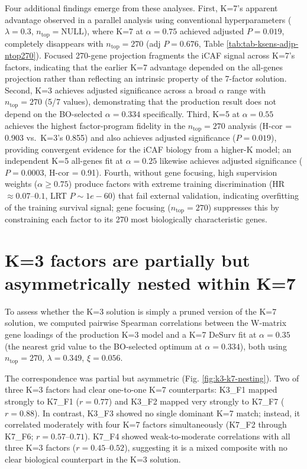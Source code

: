 \documentclass[
]{article}
\begin{document}
Four additional findings emerge from these analyses. First, K=7's
apparent advantage observed in a parallel analysis using conventional
hyperparameters (\(\lambda=0.3\), \(n_{\text{top}} = \text{NULL}\)),
where K=7 at \(\alpha=0.75\) achieved adjusted \(P = 0.019\), completely
disappears with \(n_{\text{top}} = 270\) (adj \(P = 0.676\), Table
\ref{tab:tab-ksens-adjp-ntop270}). Focused 270-gene projection fragments
the iCAF signal across K=7's factors, indicating that the earlier K=7
advantage depended on the all-genes projection rather than reflecting an
intrinsic property of the 7-factor solution. Second, K=3 achieves
adjusted significance across a broad \(\alpha\) range with
\(n_{\text{top}} = 270\) (5/7 values), demonstrating that the production
result does not depend on the BO-selected \(\alpha = 0.334\)
specifically. Third, K=5 at \(\alpha=0.55\) achieves the highest
factor-program fidelity in the \(n_{\text{top}} = 270\) analysis (H-cor
= 0.903 vs.~K=3's 0.855) and also achieves adjusted significance
(\(P = 0.019\)), providing convergent evidence for the iCAF biology from
a higher-K model; an independent K=5 all-genes fit at \(\alpha=0.25\)
likewise achieves adjusted significance (\(P = 0.0003\), H-cor = 0.91).
Fourth, without gene focusing, high supervision weights
(\(\alpha \geq 0.75\)) produce factors with extreme training
discrimination (HR \(\approx 0.07\)--\(0.1\), LRT \(P \sim 1e-60\)) that
fail external validation, indicating overfitting of the training
survival signal; gene focusing (\(n_{\text{top}} = 270\)) suppresses
this by constraining each factor to its 270 most biologically
characteristic genes.

\section{K=3 factors are partially but asymmetrically nested within
K=7}\label{k3-factors-are-partially-but-asymmetrically-nested-within-k7}

To assess whether the K=3 solution is simply a pruned version of the K=7
solution, we computed pairwise Spearman correlations between the
W-matrix gene loadings of the production K=3 model and a K=7 DeSurv fit
at \(\alpha = 0.35\) (the nearest grid value to the BO-selected optimum
at \(\alpha = 0.334\)), both using \(n_{\text{top}} = 270\),
\(\lambda = 0.349\), \(\xi = 0.056\).

The correspondence was partial but asymmetric (Fig.
\ref{fig:k3-k7-nesting}). Two of three K=3 factors had clear one-to-one
K=7 counterparts: K3\_F1 mapped strongly to K7\_F1 (\(r = 0.77\)) and
K3\_F2 mapped very strongly to K7\_F7 (\(r = 0.88\)). In contrast,
K3\_F3 showed no single dominant K=7 match; instead, it correlated
moderately with four K=7 factors simultaneously (K7\_F2 through K7\_F6;
\(r = 0.57\)--\(0.71\)). K7\_F4 showed weak-to-moderate correlations
with all three K=3 factors (\(r = 0.45\)--\(0.52\)), suggesting it is a
mixed composite with no clear biological counterpart in the K=3
solution.
\end{document}
